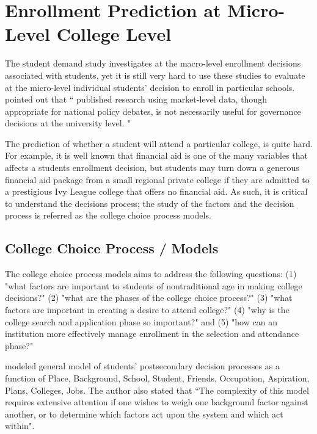 \documentclass[12pt,english]{report}
\begin{document}
\section{Enrollment Prediction at Micro-Level College Level}
The student demand study investigates at the macro-level enrollment decisions
associated with students, yet it is still very hard to use these studies to
evaluate at the micro-level individual students' decision to enroll in
particular schools. \citet{Carter2011} pointed out that `` published research
using market-level data, though appropriate for national policy debates, is not
necessarily useful for governance decisions at the university level. "

The prediction of whether a student  will attend a particular college, is quite
hard.  For example,  it is well known that financial aid is one of the many
variables that affects a students enrollment decision, but students may turn
down a generous financial aid package from a small regional private college if
they are admitted to a prestigious Ivy League college that offers no financial
aid.  As such, it is critical to understand the decisions process; the study of
the factors and the decision process is referred as the college choice process
models.

\subsection{College Choice Process / Models} 
The college choice process models aims to address the following questions: (1)
"what factors are important to students of nontraditional age in making college
decisions?" (2) "what are the phases of the college choice process?" (3) "what
factors are important in creating a desire to attend college?" (4) "why is the
college search and application phase so important?" and (5) "how can an
institution more effectively manage enrollment in the selection and attendance
phase?" \citep{Paulsen1990}

\citet{Jackson1978}  modeled general model of students' postsecondary decision
processes as a function of Place, Background, School, Student, Friends,
Occupation, Aspiration, Plans, Colleges, Jobs.  The author also stated that
``The complexity of this model requires extensive attention if one wishes to
weigh one background factor against another, or to determine which  factors act
upon the system and which act within".
\end{document}
